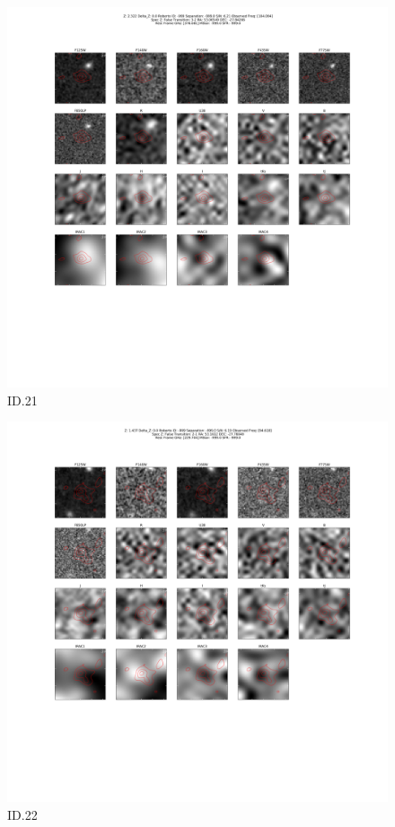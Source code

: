 \begin{figure}[tbp]
\centering \includegraphics[width=120mm]{Matched/ASPECS_Cutout_21.png}
\caption{ID.21}
\label{fig:Match_Three}
\end{figure}

\begin{figure}[tbp]
\centering \includegraphics[width=120mm]{Matched/ASPECS_Cutout_22.png}
\caption{ID.22}
\label{fig:Match_Three}
\end{figure}

